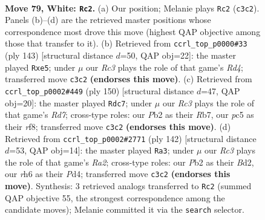 \documentclass[11pt]{article}
\begin{document}
\clearpage

\begin{figure}[p]\centering
\begin{subfigure}{0.46\textwidth}\centering
\resizebox{\linewidth}{!}{%
\newchessgame
\chessboard[
  setfen={8/8/p6r/Pppk1p1p/2p2P1P/2R1PKP1/1P6/8 w - - 3 79},
  showmover=false,
  pgfstyle=straightmove, color=movearrow, markmove={c3-c2}
]}
\caption{}
\end{subfigure}\hfill
\begin{subfigure}{0.46\textwidth}\centering
\resizebox{\linewidth}{!}{%
\newchessgame
\chessboard[
  setfen={8/5p2/1K2k1p1/1p1rP1p1/pP4P1/P1R2P2/8/8 b - - 14 72},
  showmover=false,
  pgfstyle=straightmove, color=movearrow, markmove={d5-e5}
]}
\caption{}
\end{subfigure}
\\[4pt]
\begin{subfigure}{0.46\textwidth}\centering
\resizebox{\linewidth}{!}{%
\newchessgame
\chessboard[
  setfen={5r2/1R1R1p2/4pk2/r2p1p1p/3P3P/4P1P1/4KP2/8 w - - 4 76},
  showmover=false,
  pgfstyle=straightmove, color=movearrow, markmove={d7-c7}
]}
\caption{}
\end{subfigure}\hfill
\begin{subfigure}{0.46\textwidth}\centering
\resizebox{\linewidth}{!}{%
\newchessgame
\chessboard[
  setfen={3b4/8/2rp2p1/1k1p1p1p/p2P3P/4P1P1/RP1B1P2/3K4 w - - 50 72},
  showmover=false,
  pgfstyle=straightmove, color=movearrow, markmove={a2-a3}
]}
\caption{}
\end{subfigure}
\caption{\textbf{Move 79, White: \texttt{Rc2}.} (a) Our position; Melanie plays \texttt{Rc2} (\texttt{c3c2}). Panels (b)--(d) are the retrieved master positions whose correspondence most drove this move (highest QAP objective among those that transfer to it). (b) Retrieved from \texttt{ccrl\_top\_p0000\#33} (ply 143) [structural distance $d$=50, QAP obj=22]: the master played \texttt{Rxe5}; under $\mu$ our \emph{Rc3} plays the role of that game's \emph{Rd4}; transferred move \texttt{c3c2} \textbf{(endorses this move)}. (c) Retrieved from \texttt{ccrl\_top\_p0002\#449} (ply 150) [structural distance $d$=47, QAP obj=20]: the master played \texttt{Rdc7}; under $\mu$ our \emph{Rc3} plays the role of that game's \emph{Rd7}; cross-type roles: our \emph{P}b2 as their \emph{R}b7, our \emph{p}c5 as their \emph{r}f8; transferred move \texttt{c3c2} \textbf{(endorses this move)}. (d) Retrieved from \texttt{ccrl\_top\_p0002\#2771} (ply 142) [structural distance $d$=53, QAP obj=14]: the master played \texttt{Ra3}; under $\mu$ our \emph{Rc3} plays the role of that game's \emph{Ra2}; cross-type roles: our \emph{P}b2 as their \emph{B}d2, our \emph{r}h6 as their \emph{P}d4; transferred move \texttt{c3c2} \textbf{(endorses this move)}. Synthesis: 3 retrieved analogs transferred to \texttt{Rc2} (summed QAP objective 55, the strongest correspondence among the candidate moves); Melanie committed it via the \texttt{search} selector.}
\label{fig:thought-m156}
\end{figure}
\end{document}
